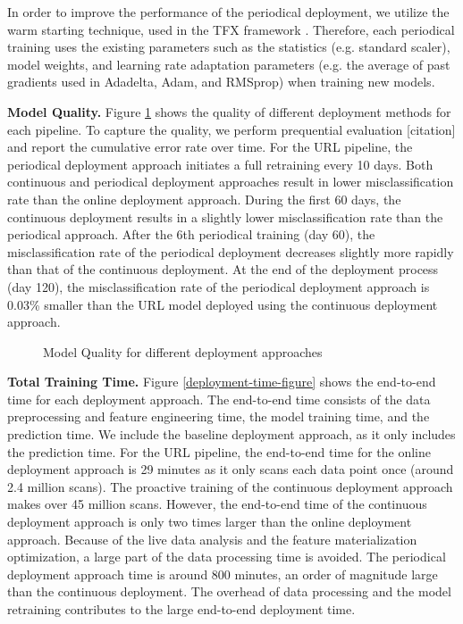 In order to improve the performance of the periodical deployment, we utilize the warm starting technique, used in the TFX framework \cite{baylor2017tfx}.
Therefore, each periodical training uses the existing parameters such as the statistics (e.g. standard scaler), model weights, and learning rate adaptation parameters (e.g. the average of past gradients used in Adadelta, Adam, and RMSprop) when training new models.

\textbf{Model Quality. }
Figure \ref{deployment-quality-figure} shows the quality of different deployment methods for each pipeline. 
To capture the quality, we perform prequential evaluation [citation] and report the cumulative error rate over time.
For the URL pipeline, the periodical deployment approach initiates a full retraining every 10 days.
Both continuous and periodical deployment approaches result in lower misclassification rate than the online deployment approach.
During the first 60 days, the continuous deployment results in a slightly lower misclassification rate than the periodical approach.
After the 6th periodical training (day 60), the misclassification rate of the periodical deployment decreases slightly more rapidly than that of the continuous deployment. 
At the end of the deployment process (day 120), the misclassification rate of the periodical deployment approach is 0.03\% smaller than the URL model deployed using the continuous deployment approach.
\begin{figure}[h!]
\centering
\resizebox{\columnwidth}{!}{}
\caption{Model Quality for different deployment approaches}
\label{deployment-quality-figure}
\end{figure}

\textbf{Total Training Time. }
Figure \ref{deployment-time-figure} shows the end-to-end  time for each deployment approach.
The end-to-end time consists of the data preprocessing and feature engineering time, the model training time, and the prediction time. 
We include the baseline deployment approach, as it only includes the prediction time.
For the URL pipeline, the end-to-end time for the online deployment approach is 29 minutes as it only scans each data point once (around 2.4 million scans).  
The proactive training of the continuous deployment approach makes over 45 million scans.
However, the end-to-end time of the continuous deployment approach is only two times larger than the online deployment approach. 
Because of the live data analysis and the feature materialization optimization, a large part of the data processing time is avoided.
The periodical deployment approach time is around 800 minutes, an order of magnitude large than the continuous deployment. 
The overhead of data processing and the model retraining contributes to the large end-to-end deployment time.

